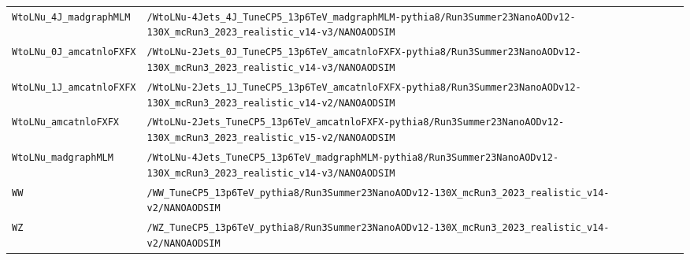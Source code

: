 \begin{longtable}{@{}>{\RaggedRight\arraybackslash}p{} >{\RaggedRight\arraybackslash}p{}@{}}
\texttt{WtoLNu\_\allowbreak{}4J\_\allowbreak{}madgraphMLM} & \texttt{/\allowbreak{}WtoLNu-\allowbreak{}4Jets\_\allowbreak{}4J\_\allowbreak{}TuneCP5\_\allowbreak{}13p6TeV\_\allowbreak{}madgraphMLM-\allowbreak{}pythia8/\allowbreak{}Run3Summer23NanoAODv12-\allowbreak{}130X\_\allowbreak{}mcRun3\_\allowbreak{}2023\_\allowbreak{}realistic\_\allowbreak{}v14-\allowbreak{}v3/\allowbreak{}NANOAODSIM} \\
\addlinespace[2pt]
\texttt{WtoLNu\_\allowbreak{}0J\_\allowbreak{}amcatnloFXFX} & \texttt{/\allowbreak{}WtoLNu-\allowbreak{}2Jets\_\allowbreak{}0J\_\allowbreak{}TuneCP5\_\allowbreak{}13p6TeV\_\allowbreak{}amcatnloFXFX-\allowbreak{}pythia8/\allowbreak{}Run3Summer23NanoAODv12-\allowbreak{}130X\_\allowbreak{}mcRun3\_\allowbreak{}2023\_\allowbreak{}realistic\_\allowbreak{}v14-\allowbreak{}v3/\allowbreak{}NANOAODSIM} \\
\addlinespace[2pt]
\texttt{WtoLNu\_\allowbreak{}1J\_\allowbreak{}amcatnloFXFX} & \texttt{/\allowbreak{}WtoLNu-\allowbreak{}2Jets\_\allowbreak{}1J\_\allowbreak{}TuneCP5\_\allowbreak{}13p6TeV\_\allowbreak{}amcatnloFXFX-\allowbreak{}pythia8/\allowbreak{}Run3Summer23NanoAODv12-\allowbreak{}130X\_\allowbreak{}mcRun3\_\allowbreak{}2023\_\allowbreak{}realistic\_\allowbreak{}v14-\allowbreak{}v2/\allowbreak{}NANOAODSIM} \\
\addlinespace[2pt]
\texttt{WtoLNu\_\allowbreak{}amcatnloFXFX} & \texttt{/\allowbreak{}WtoLNu-\allowbreak{}2Jets\_\allowbreak{}TuneCP5\_\allowbreak{}13p6TeV\_\allowbreak{}amcatnloFXFX-\allowbreak{}pythia8/\allowbreak{}Run3Summer23NanoAODv12-\allowbreak{}130X\_\allowbreak{}mcRun3\_\allowbreak{}2023\_\allowbreak{}realistic\_\allowbreak{}v15-\allowbreak{}v2/\allowbreak{}NANOAODSIM} \\
\addlinespace[2pt]
\texttt{WtoLNu\_\allowbreak{}madgraphMLM} & \texttt{/\allowbreak{}WtoLNu-\allowbreak{}4Jets\_\allowbreak{}TuneCP5\_\allowbreak{}13p6TeV\_\allowbreak{}madgraphMLM-\allowbreak{}pythia8/\allowbreak{}Run3Summer23NanoAODv12-\allowbreak{}130X\_\allowbreak{}mcRun3\_\allowbreak{}2023\_\allowbreak{}realistic\_\allowbreak{}v14-\allowbreak{}v3/\allowbreak{}NANOAODSIM} \\
\addlinespace[2pt]
\texttt{WW} & \texttt{/\allowbreak{}WW\_\allowbreak{}TuneCP5\_\allowbreak{}13p6TeV\_\allowbreak{}pythia8/\allowbreak{}Run3Summer23NanoAODv12-\allowbreak{}130X\_\allowbreak{}mcRun3\_\allowbreak{}2023\_\allowbreak{}realistic\_\allowbreak{}v14-\allowbreak{}v2/\allowbreak{}NANOAODSIM} \\
\addlinespace[2pt]
\texttt{WZ} & \texttt{/\allowbreak{}WZ\_\allowbreak{}TuneCP5\_\allowbreak{}13p6TeV\_\allowbreak{}pythia8/\allowbreak{}Run3Summer23NanoAODv12-\allowbreak{}130X\_\allowbreak{}mcRun3\_\allowbreak{}2023\_\allowbreak{}realistic\_\allowbreak{}v14-\allowbreak{}v2/\allowbreak{}NANOAODSIM} \\

\end{longtable}
